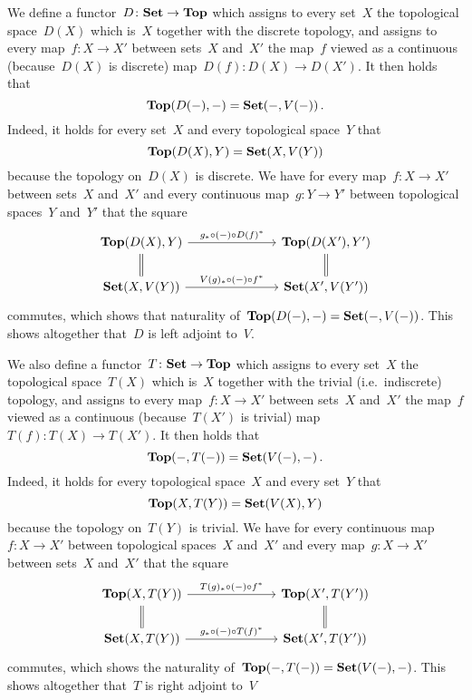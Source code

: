 We define a functor~$D \colon \mathbf{Set} \to \mathbf{Top}$ which assigns to every set~$X$ the topological space~$D(X)$ which is~$X$ together with the discrete topology, and assigns to every map~$f \colon X \to X'$ between sets~$X$ and~$X'$ the map~$f$ viewed as a continuous (because~$D(X)$ is discrete) map~$D(f) \colon D(X) \to D(X')$.
It then holds that
\[
    \mathbf{Top}(D(-), -)
  = \mathbf{Set}(-,V(-)) \,.
\]
Indeed, it holds for every set~$X$ and every topological space~$Y$ that
\[
    \mathbf{Top}(D(X), Y)
  = \mathbf{Set}(X, V(Y))
\]
because the topology on~$D(X)$ is discrete.
We have for every map~$f \colon X \to X'$ between sets~$X$ and~$X'$ and every continuous map~$g \colon Y \to Y'$ between topological spaces~$Y$ and~$Y'$ that the square
\[
  \begin{tikzcd}[column sep = 7em]
      \Top(D(X), Y)
      \arrow{r}[above]{g_* \circ (-) \circ D(f)^*}
      \arrow[equal]{d}
    & \Top(D(X'), Y')
      \arrow[equal]{d}
    \\
      \Set(X, V(Y))
      \arrow{r}[above]{V(g)_* \circ (-) \circ f^*}
    & \Set(X', V(Y'))
  \end{tikzcd}
\]
commutes, which shows that naturality of~$\mathbf{Top}(D(-),-) = \mathbf{Set}(-,V(-))$.
This shows altogether that~$D$ is left adjoint to~$V$.

We also define a functor~$T \colon \mathbf{Set} \to \mathbf{Top}$ which assigns to every set~$X$ the topological space~$T(X)$ which is~$X$ together with the trivial (i.e.\ indiscrete) topology, and assigns to every map~$f \colon X \to X'$ between sets~$X$ and~$X'$ the map~$f$ viewed as a continuous (because~$T(X')$ is trivial) map~$T(f) \colon T(X) \to T(X')$.
It then holds that
\[
    \mathbf{Top}(-, T(-))
  = \mathbf{Set}(V(-), -) \,.
\]
Indeed, it holds for every topological space~$X$ and every set~$Y$ that
\[
    \mathbf{Top}(X, T(Y))
  = \mathbf{Set}(V(X), Y)
\]
because the topology on~$T(Y)$ is trivial.
We have for every continuous map~$f \colon X \to X'$ between topological spaces~$X$ and~$X'$ and every map~$g \colon X \to X'$ between sets~$X$ and~$X'$ that the square
\[
  \begin{tikzcd}[column sep = 7em]
      \Top(X, T(Y))
      \arrow[equal]{d}
      \arrow{r}[above]{T(g)_* \circ (-) \circ f^*}
    & \Top(X', T(Y'))
      \arrow[equal]{d}
    \\
      \Set(X, T(Y))
      \arrow{r}[above]{g_* \circ (-) \circ T(f)^*}
    & \Set(X', T(Y'))
  \end{tikzcd}
\]
commutes, which shows the naturality of~$\mathbf{Top}(-,T(-)) = \mathbf{Set}(V(-),-)$.
This shows altogether that~$T$ is right adjoint to~$V$














